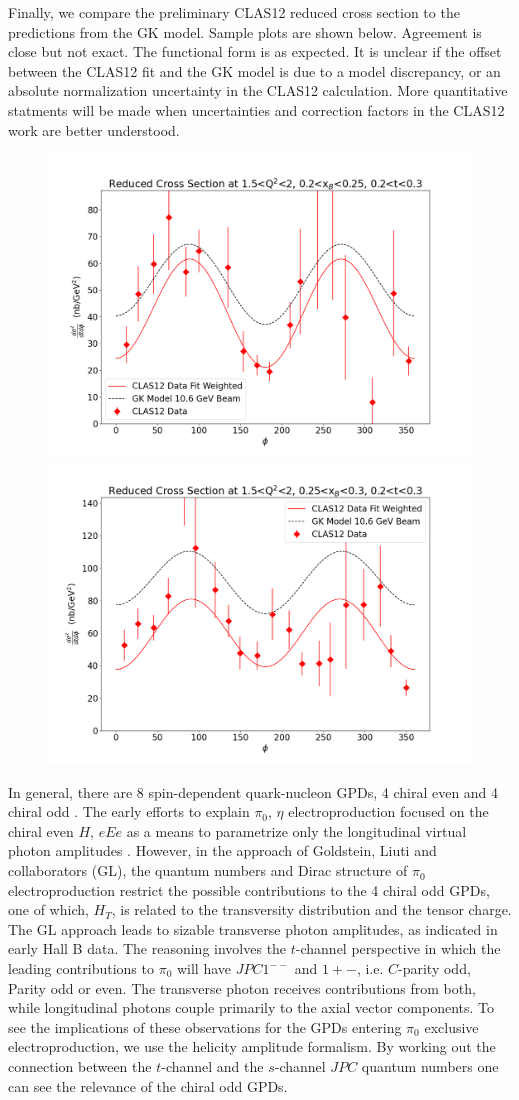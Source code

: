     Finally, we compare the preliminary CLAS12 reduced cross section to the predictions from the GK model. Sample plots are shown below. Agreement is close but not exact. The functional form is as expected. It is unclear if the offset between the CLAS12 fit and the GK model is due to a model discrepancy, or an absolute normalization uncertainty in the CLAS12 calculation. More quantitative statments will be made when uncertainties and correction factors in the CLAS12 work are better understood.
    \begin{figure}[hbt]
    	\centering
    	\includegraphics[page=6,width=0.45\linewidth]{Chapters/Ch5-Further/GK_model/pics/reduced_xsec_1.5_2_0.2_0.25_0.2_0.3.png}
    	\includegraphics[page=6,width=0.45\linewidth]{Chapters/Ch5-Further/GK_model/pics/reduced_xsec_1.5_2_0.25_0.3_0.2_0.3.png}
    \end{figure}\label{fig:oldres4}
    
    
    
    \iffalse
    In general, there are 8 spin-dependent quark-nucleon GPDs, 4 chiral even and 4 chiral odd \cite{8}. The early efforts to explain $\pi_0$, $\eta$ electroproduction focused on the chiral even $H$, $e Ee$ as a means to parametrize only the longitudinal virtual photon amplitudes \cite{7}. However, in the approach of Goldstein, Liuti and collaborators \cite{9} (GL), the quantum numbers and Dirac structure of $\pi_0$ electroproduction restrict the possible contributions to the 4 chiral odd GPDs, one of which, $H_T$, is related to the transversity distribution and the tensor charge. The GL approach leads to sizable transverse photon amplitudes, as indicated in early Hall B data. The reasoning involves the $t$-channel perspective in which the leading contributions to $\pi_0$ will have $J P C 1^{-−}$ and $1+−$, i.e. $C$-parity odd, Parity odd or even. The transverse photon receives contributions from both, while longitudinal photons couple primarily to the axial vector components. To see the implications of these observations for the GPDs entering $\pi_0$ exclusive electroproduction, we use the helicity amplitude formalism. By working out the connection between the $t$-channel and the $s$-channel $J P C$ quantum numbers one can see the relevance of the chiral odd GPDs.
    
